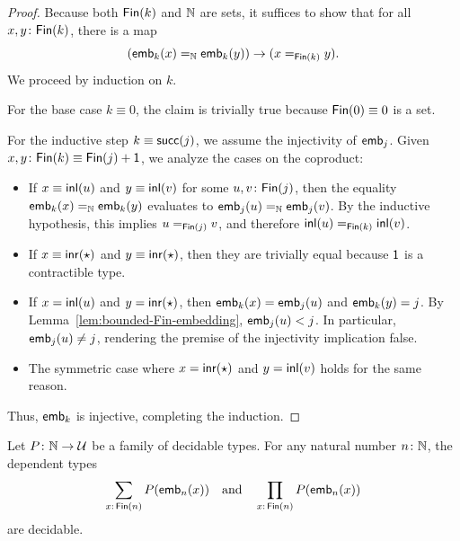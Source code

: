 \begin{proof}
    Because both $\mathsf{Fin}(k)$ and $\mathbb{N}$ are sets, it suffices to show that for all $x,y\colon\fun{Fin}(k)$, there is a map
    \[
        (\mathsf{emb}_k(x)\mathrel{=_{\mathbb{N}}}\mathsf{emb}_k(y))
        \to
        (x\mathrel{=_{\mathsf{Fin}(k)}}y).
    \]
    We proceed by induction on $k$.
    
    For the base case $k\equiv0$, the claim is trivially true because $\mathsf{Fin}(0)\equiv0$ is a set.
    
    For the inductive step $k\equiv\mathsf{succ}(j)$, we assume the injectivity of $\mathsf{emb}_j$. Given $x,y\colon\fun{Fin}(k)\equiv\fun{Fin}(j)+\fun1$, we analyze the cases on the coproduct:
    \begin{itemize}
        \item If $x\equiv\mathsf{inl}(u)$ and $y\equiv\mathsf{inl}(v)$ for some $u,v\colon\fun{Fin}(j)$, then the equality $\mathsf{emb}_k(x)\mathrel{=_{\mathbb{N}}}\mathsf{emb}_k(y)$ evaluates to $\mathsf{emb}_j(u)\mathrel{=_{\mathbb{N}}}\mathsf{emb}_j(v)$. By the inductive hypothesis, this implies $u\mathrel{=_{\mathsf{Fin}(j)}}v$, and therefore $\mathsf{inl}(u)\mathrel{=_{\mathsf{Fin}(k)}}\mathsf{inl}(v)$.
        
        \item If $x\equiv\mathsf{inr}({\mathsf{\star}})$ and $y\equiv\mathsf{inr}({\mathsf{\star}})$, then they are trivially equal because $\mathsf{1}$ is a contractible type.
        
        \item If $x=\mathsf{inl}(u)$ and $y=\mathsf{inr}({\mathsf{\star}})$, then $\mathsf{emb}_k(x)=\mathsf{emb}_j(u)$ and $\mathsf{emb}_k(y)=j$. By Lemma~\ref{lem:bounded-Fin-embedding}, $\mathsf{emb}_j(u)<j$. In particular, $\mathsf{emb}_j(u)\neq j$, rendering the premise of the injectivity implication false.
        
        \item The symmetric case where $x=\mathsf{inr}(\star)$ and $y=\mathsf{inl}(v)$ holds for the same reason.
    \end{itemize}
    Thus, $\mathsf{emb}_k$ is injective, completing the induction.
\end{proof}

\begin{lem}\label{lem:decidable-bounded-types}
    Let\/ $P\colon\N\to\univ$ be a family of decidable types. For any natural number\/ $n\colon\N$, the dependent types
    \[
        \sum_{x\colon\fun{Fin}(n)}P(\fun{emb}_n(x))
        \quad\text{and}\quad
        \prod_{x\colon\fun{Fin}(n)}P(\fun{emb}_n(x))
    \]
    are decidable.
\end{lem}

